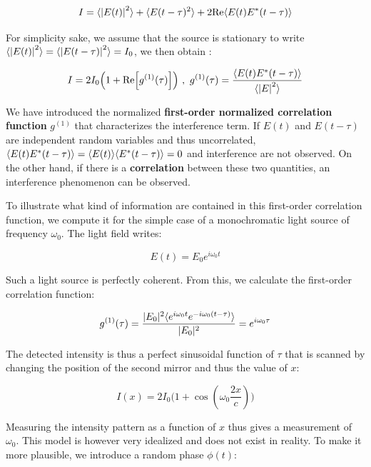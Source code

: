 \begin{equation}
    I=\langle\left\lvert E(t)\right\rvert^2\rangle  + \langle E(t-\tau)^2\rangle + 2 {\rm{Re}} \langle E(t) E^*(t-\tau)\rangle
    \label{eq:def_g1}
\end{equation}

For simplicity sake, we assume that the source is stationary to write $\langle\left\lvert E(t)\right\rvert^2\rangle = \langle\left\lvert E(t-\tau)\right\rvert^2\rangle = I_0$, we then obtain :

\begin{equation}
    I= 2 I_0 \Big(1 + {\rm{Re}} \Big[g^{(1)} (\tau) \Big] \Big) \ , \ g^{(1)} (\tau) = \frac{ \langle E(t) E^*(t-\tau)\rangle}{\langle\left\lvert E\right\rvert^2\rangle}
\end{equation}

\noindent We have introduced the normalized \textbf{first-order normalized correlation function} $g^{(1)}$ that characterizes the interference term. If $E(t)$ and $E(t-\tau)$ are independent random variables and thus uncorrelated, $\langle E(t) E^*(t-\tau)\rangle = \langle E(t)\rangle \langle E^*(t-\tau)\rangle=0$ and interference are not observed. On the other hand, if there is a \textbf{correlation} between these two quantities, an interference phenomenon can be observed. 

To illustrate what kind of information are contained in this first-order correlation function, we compute it for the simple case of a monochromatic light source of frequency $\omega_0$. The light field writes:

\begin{equation}
    E(t)=E_0 e^{i \omega_0 t}
\end{equation}

\noindent Such a light source is perfectly coherent. From this, we calculate the first-order correlation function:

\begin{equation}
    g^{(1)} (\tau) = \frac{|E_0|^2 \langle e^{i\omega_0 t} e^{-i \omega_0 (t-\tau)}\rangle}{|E_0|^2} = e^{i \omega_0 \tau}
\end{equation}

\noindent The detected intensity is thus a perfect sinusoidal function of $\tau$ that is scanned by changing the position of the second mirror and thus the value of $x$:

\begin{equation}
I(x)= 2 I_0 \Big(1+\cos(\omega_0 \frac{2x}{c}) \Big)
\end{equation}

\noindent Measuring the intensity pattern as a function of $x$ thus gives a measurement of $\omega_0$. This model is however very idealized and does not exist in reality. To make it more plausible, we introduce a random phase $\phi(t)$:

